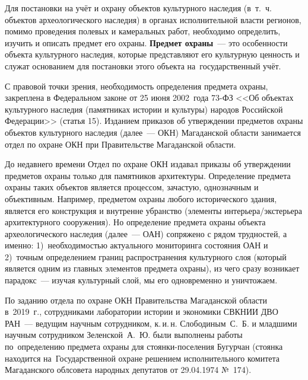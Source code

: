  

\makeProcTitleRazdel
{}

Для постановки на учёт и охрану объектов культурного наследия (в~т.~ч. объектов археологического наследия) в органах исполнительной власти регионов, помимо проведения полевых и камеральных работ, необходимо определить, изучить и описать предмет его охраны. \textbf{Предмет охраны}~--- это особенности объекта культурного наследия, которые представляют его культурную ценность и служат основанием для постановки этого объекта на~государственный учёт.

С правовой точки зрения, необходимость определения предмета охраны, закреплена в Федеральном законе от 25 июня 2002~года 73-ФЗ <<Об объектах культурного наследия (памятниках истории и культуры) народов Российской Федерации>> (статья 15). Изданием приказов об утверждении предметов охраны объектов культурного наследия (далее~--- ОКН) Магаданской области занимается отдел по охране ОКН при Правительстве Магаданской области.

До недавнего времени Отдел по охране ОКН издавал приказы об утверждении предметов охраны только для памятников архитектуры. Определение предмета охраны таких объектов является процессом, зачастую, однозначным и объективным. Например, предметом охраны любого исторического здания, является его конструкция и внутренне убранство (элементы интерьера/экстерьера архитектурного сооружения). Но определение предмета охраны объекта археологического наследия (далее~--- ОАН) сопряжено с рядом трудностей, а именно: 1)~необходимостью актуального мониторинга состояния ОАН и 2)~точным определением границ распространения культурного слоя (который является одним из главных элементов предмета охраны), из чего сразу возникает парадокс~--- изучая культурный слой, мы его одновременно и уничтожаем.

 По заданию отдела по охране ОКН Правительства Магаданской области в~2019~г., сотрудниками лаборатории истории и экономики СВКНИИ ДВО РАН~--- ведущим научным сотрудником, к.\,и.\,н. Слободиным~С.~Б. и младшими научным сотрудником Зеленской~А.~Ю. были выполнены работы по~определению предмета охраны для стоянки-поселения Бугурчан (стоянка находится на~Государственной охране решением исполнительного комитета Магаданского облсовета народных депутатов от 29.04.1974 №~174).

